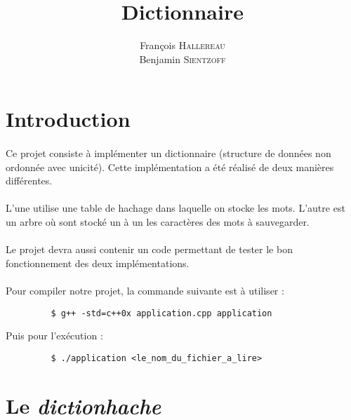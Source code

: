 \documentclass[12pt,a4paper,final]{article}
\author{François \textsc{Hallereau} \\ Benjamin \textsc{Sientzoff}}
\title{Dictionnaire}
\begin{document}
\maketitle

\vspace{5cm}

\tableofcontents

\newpage

\section*{Introduction}
    \paragraph{}{Ce projet consiste à implémenter un dictionnaire (structure de données non ordonnée avec unicité). Cette implémentation a été réalisé de deux manières différentes.}

    \paragraph{}{L'une utilise une table de hachage dans laquelle on stocke les mots. L'autre est un arbre où sont stocké un à un les caractères des mots à sauvegarder.}

    \paragraph{}{Le projet devra aussi contenir un code permettant de tester le bon fonctionnement des deux implémentations.}

    \paragraph{}{Pour compiler notre projet, la commande suivante est à utiliser :
        \begin{verbatim}
         $ g++ -std=c++0x application.cpp application
        \end{verbatim}

Puis pour l'exécution :
        \begin{verbatim}
         $ ./application <le_nom_du_fichier_a_lire>
        \end{verbatim}
}


\newpage

\section{Le \emph{dictionhache}}
\end{document}
